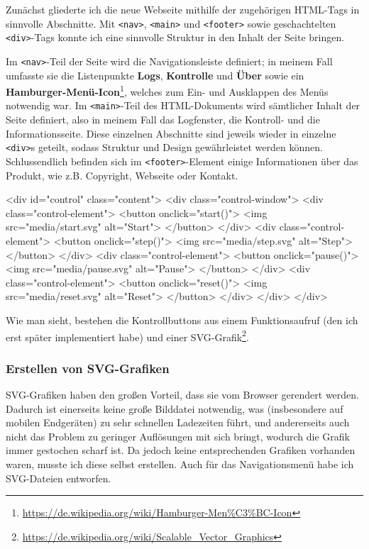 Zunächst gliederte ich die neue Webseite mithilfe der zugehörigen HTML-Tags in sinnvolle
Abschnitte. Mit \texttt{<nav>}, \texttt{<main>} und \texttt{<footer>} sowie geschachtelten
\texttt{<div>}-Tags konnte ich eine sinnvolle Struktur in den Inhalt der Seite bringen.

Im \texttt{<nav>}-Teil der Seite wird die Navigationsleiste definiert; in meinem
Fall umfasste sie die Listenpunkte \textbf{Logs}, \textbf{Kontrolle} und \textbf{Über}
sowie ein \textbf{Hamburger-Menü-Icon}\footnote{\url{https://de.wikipedia.org/wiki/Hamburger-Men\%C3\%BC-Icon}},
welches zum Ein- und Ausklappen des Menüs notwendig war. Im \texttt{<main>}-Teil
des HTML-Dokuments wird sämtlicher Inhalt der Seite definiert, also in meinem Fall
das Logfenster, die Kontroll- und die Informationsseite. Diese einzelnen Abschnitte
sind jeweils wieder in einzelne \texttt{<div>}s geteilt, sodass Struktur und Design
gewährleistet werden können. Schlussendlich befinden sich im \texttt{<footer>}-Element
einige Informationen über das Produkt, wie z.B. Copyright, Webseite oder Kontakt.

\begin{code}[language=html, caption={Struktur der Kontrollseite}]
<div id="control" class="content">
	<div class="control-window">
		<div class="control-element">
			<button onclick="start()">
				<img src="media/start.svg" alt="Start">
			</button>
		</div>
		<div class="control-element">
			<button onclick="step()">
				<img src="media/step.svg" alt="Step">
			</button>
		</div>
		<div class="control-element">
			<button onclick="pause()">
				<img src="media/pause.svg" alt="Pause">
			</button>
		</div>
		<div class="control-element">
			<button onclick="reset()">
				<img src="media/reset.svg" alt="Reset">
			</button>
		</div>
	</div>
</div>
\end{code}

Wie man sieht, bestehen die Kontrollbuttons aus einem Funktionsaufruf (den ich erst
später implementiert habe) und einer SVG-Grafik\footnote{\url{https://de.wikipedia.org/wiki/Scalable\_Vector\_Graphics}}.

\subsubsection{Erstellen von SVG-Grafiken}

SVG-Grafiken haben den großen Vorteil, dass sie vom Browser gerendert werden. Dadurch
ist einerseits keine große Bilddatei notwendig, was (insbesondere auf mobilen Endgeräten)
zu sehr schnellen Ladezeiten führt, und andererseits auch nicht das Problem zu geringer
Auflösungen mit sich bringt, wodurch die Grafik immer gestochen scharf ist. Da jedoch
keine entsprechenden Grafiken vorhanden waren, musste ich diese selbst erstellen.
Auch für das Navigationsmenü habe ich SVG-Dateien entworfen.


